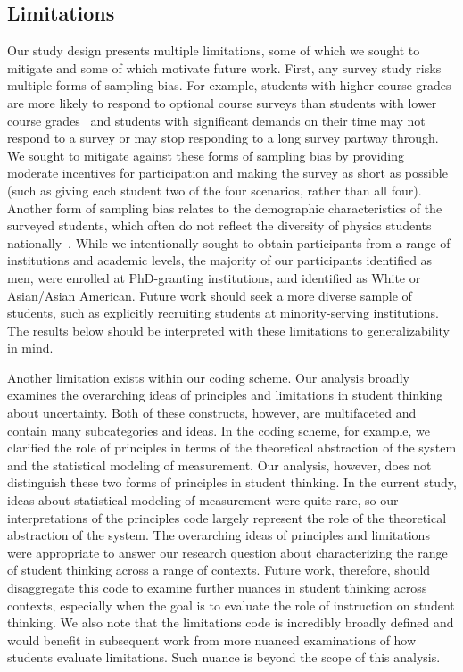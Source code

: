 \documentclass[english,aps,prstper,reprint,showpacs,longbibliography,superscriptaddress,nofootinbib]{revtex4-2}
\begin{document}
\subsection{Limitations}

Our study design presents multiple limitations, some of which we sought to mitigate and some of which motivate future work. First, any survey study risks multiple forms of sampling bias. For example, students with higher course grades are more likely to respond to optional course surveys than students with lower course grades~\cite{Nissen2019} and students with significant demands on their time may not respond to a survey or may stop responding to a long survey partway through. We sought to mitigate against these forms of sampling bias by providing moderate incentives for participation and making the survey as short as possible (such as giving each student two of the four scenarios, rather than all four). Another form of sampling bias relates to the demographic characteristics of the surveyed students, which often do not reflect the diversity of physics students nationally~\cite{Kanim2020}. While we intentionally sought to obtain participants from a range of institutions and academic levels, the majority of our participants identified as men, were enrolled at PhD-granting institutions, and identified as White or Asian/Asian American. Future work should seek a more diverse sample of students, such as explicitly recruiting students at minority-serving institutions. The results below should be interpreted with these limitations to generalizability in mind.

Another limitation exists within our coding scheme. Our analysis broadly examines the overarching ideas of principles and limitations in student thinking about uncertainty. Both of these constructs, however, are multifaceted and contain many subcategories and ideas. In the coding scheme, for example, we clarified the role of principles in terms of the theoretical abstraction of the system and the statistical modeling of measurement. Our analysis, however, does not distinguish these two forms of principles in student thinking. In the current study, ideas about statistical modeling of measurement were quite rare, so our interpretations of the principles code largely represent the role of the theoretical abstraction of the system. The overarching ideas of principles and limitations were appropriate to answer our research question about characterizing the range of student thinking across a range of contexts. Future work, therefore, should disaggregate this code to examine further nuances in student thinking across contexts, especially when the goal is to evaluate the role of instruction on student thinking. We also note that the limitations code is incredibly broadly defined and would benefit in subsequent work from more nuanced examinations of how students evaluate limitations. Such nuance is beyond the scope of this analysis. 
\end{document}

